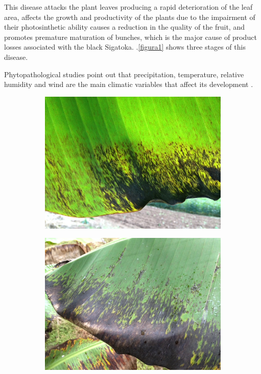 \documentclass[review]{elsarticle}
\begin{document}
This disease attacks the plant leaves producing a rapid deterioration
of the leaf area, affects the growth and productivity of the plants due to the impairment of their photosinthetic ability  causes a reduction in the quality
of the fruit, and promotes premature maturation of bunches, which is
the major cause of product losses associated with the black Sigatoka. \figurename
$.$\ref{figura1} shows three stages of this disease.

Phytopathological studies point out that precipitation, temperature,
relative humidity and wind are the main climatic variables that affect
its development \citep{MarinVargas1995}.
 	 
\begin{figure}[h] 
\begin{subfigure}{.3\textwidth}
  \centering
  \includegraphics[width=.8\linewidth]{Roya_a}
  \caption{}
  \label{fig:sfig1}
\end{subfigure}
\begin{subfigure}{.3\textwidth}
  \centering
  \includegraphics[width=.8\linewidth]{Roya_b}

\end{subfigure}
\end{figure}
\end{document}
